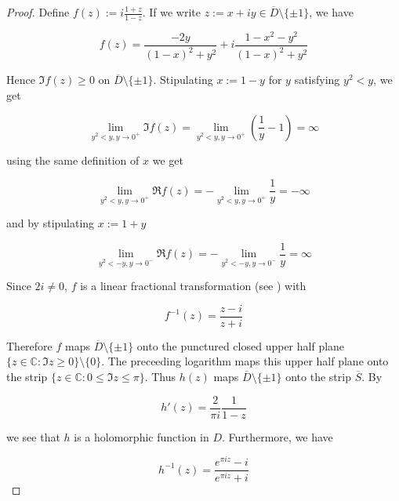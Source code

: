 \begin{proof}
	Define $\displaystyle f(z) := i\frac{1 + z}{1 - z}$. If we write $z := x + iy \in \overline{D} \setminus \{\pm 1\}$, we have 

	\begin{equation}
		f(z) = \frac{-2y}{(1 - x)^2 + y^2} + i \frac{1 - x^2 - y^2}{(1 - x)^2 + y^2}
		\label{eq:rep_lft}
	\end{equation}

	Hence $\Im f(z) \geqslant 0$ on $\overline{D}\setminus \{\pm 1\}$. Stipulating $x := 1 - y$ for $y$ satisfying $y^2 < y$, we get

	\begin{equation*}
		\lim\limits_{y^2 < y, y \rightarrow 0^+} \Im f(z) = \lim\limits_{y^2 < y, y \rightarrow 0^+} \left( \frac{1}{y} - 1 \right) = \infty
	\end{equation*}

	using the same definition of $x$ we get

	\begin{equation*}
		\lim\limits_{y^2 < y, y \rightarrow 0^+} \Re f(z) = -\lim\limits_{y^2 < y, y \rightarrow 0^+} \frac{1}{y} = -\infty
	\end{equation*}

	and by stipulating $x := 1 + y$

	\begin{equation*}
		\lim\limits_{y^2 < -y, y \rightarrow 0^-} \Re f(z) = -\lim\limits_{y^2 < -y, y \rightarrow 0^-} \frac{1}{y} = \infty	
	\end{equation*}


	Since $2i \neq 0$, $f$ is a linear fractional transformation (see \cite[279]{rudin:rc_analysis:1987}) with

	\begin{equation*}
		f^{-1}(z) = \frac{z - i}{z + i}
	\end{equation*}

	Therefore $f$ maps $\overline{D}\setminus \{\pm 1\}$ onto the punctured closed upper half plane $\{z \in \mathbb{C} : \Im z \geqslant 0\} \setminus \{0\}$. The preceeding logarithm maps this upper half plane onto the strip $\{z \in \mathbb{C} : 0 \leqslant \Im z \leqslant \pi \}$. Thus $h(z)$ maps $\overline{D}\setminus \{\pm 1\}$ onto the strip $\overline{S}$. By

\begin{equation}
	h'(z) = \frac{2}{\pi i} \frac{1}{1 - z}
	\label{eq:h_diff}
\end{equation}

	we see that $h$ is a holomorphic function in $D$. Furthermore, we have

	\begin{equation*}
		h^{-1}(z) = \frac{e^{\pi iz} - i}{e^{\pi i z} + i}
	\end{equation*}
\end{proof}

